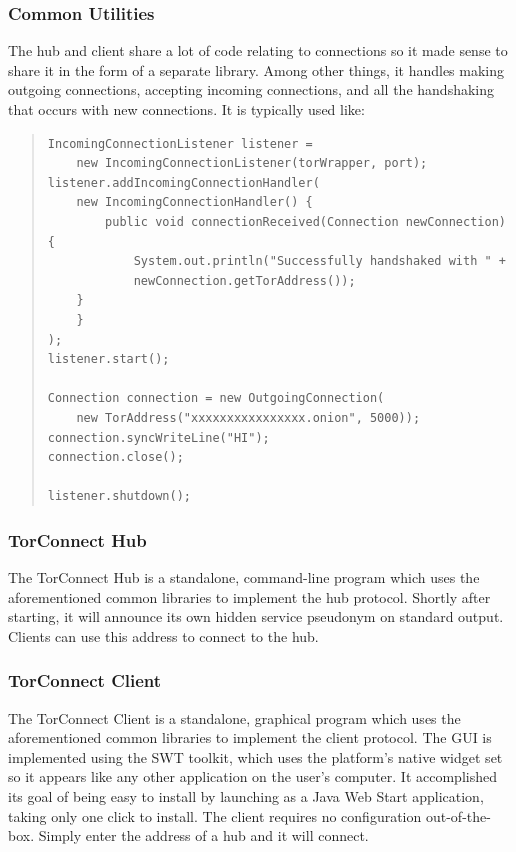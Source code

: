 \documentclass{article}
\begin{document}
\subsubsection{Common Utilities}
The hub and client share a lot of code relating to connections so it made sense to share it in the form of a separate library.  Among other things, it handles making outgoing connections, accepting incoming connections, and all the handshaking that occurs with new connections.  It is typically used like:
{ \scriptsize
\lstset{language=Java}
\begin{quote}
\begin{lstlisting}
IncomingConnectionListener listener =
	new IncomingConnectionListener(torWrapper, port);
listener.addIncomingConnectionHandler(
    new IncomingConnectionHandler() {
        public void connectionReceived(Connection newConnection) {
            System.out.println("Successfully handshaked with " +
	        newConnection.getTorAddress());
	}
    }
);
listener.start();

Connection connection = new OutgoingConnection(
	new TorAddress("xxxxxxxxxxxxxxxx.onion", 5000));
connection.syncWriteLine("HI");
connection.close();

listener.shutdown();
\end{lstlisting}
\end{quote}
}

\subsubsection{TorConnect Hub}
The TorConnect Hub is a standalone, command-line program which uses the aforementioned common libraries to implement the hub protocol.  Shortly after starting, it will announce its own hidden service pseudonym on standard output.  Clients can use this address to connect to the hub.

\subsubsection{TorConnect Client}
The TorConnect Client is a standalone, graphical program which uses the aforementioned common libraries to implement the client protocol.  The GUI is implemented using the SWT toolkit, which uses the platform's native widget set so it appears like any other application on the user's computer.  It accomplished its goal of being easy to install by launching as a Java Web Start application, taking only one click to install.  The client requires no configuration out-of-the-box.  Simply enter the address of a hub and it will connect.
\end{document}
